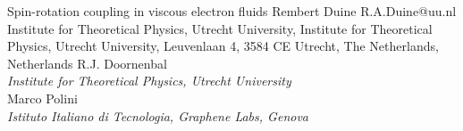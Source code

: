 \begin{conf-abstract}[]
{Spin-rotation coupling in viscous electron fluids}
{\color{blue} Rembert Duine}
{R.A.Duine@uu.nl}
{Institute for Theoretical Physics, Utrecht University, Institute for Theoretical Physics, Utrecht University, Leuvenlaan 4, 3584 CE Utrecht, The Netherlands, Netherlands}
{{\color{blue}R.J. Doornenbal}\\ \textit{Institute for Theoretical Physics, Utrecht University}\\ 
{\color{blue}Marco Polini}\\ \textit{ Istituto Italiano di Tecnologia, Graphene Labs, Genova}\\ 
\decofourleft \decofourright}





\printbibliography[heading=none]

\end{conf-abstract}
